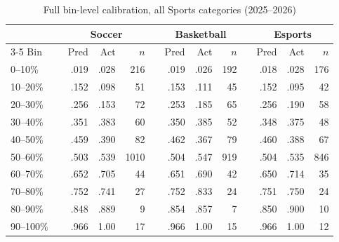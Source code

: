 \documentclass[11pt,a4paper]{article}
\begin{document}
\begin{table}[H]
\centering
\caption{Full bin-level calibration, all Sports categories (2025--2026)}
\label{tab:appendix_sports}
\scriptsize
\begin{tabular}{lcrrrcrrrcrrr}
\toprule
& & \multicolumn{3}{c}{\textbf{Soccer}} & & \multicolumn{3}{c}{\textbf{Basketball}} & & \multicolumn{3}{c}{\textbf{Esports}} \\
\cmidrule{3-5}\cmidrule{7-9}\cmidrule{11-13}
Bin & & Pred & Act & $n$ & & Pred & Act & $n$ & & Pred & Act & $n$ \\
\midrule
0--10\%  && .019 & .028 & 216 && .019 & .026 & 192 && .018 & .028 & 176 \\
10--20\% && .152 & .098 &  51 && .153 & .111 &  45 && .152 & .095 &  42 \\
20--30\% && .256 & .153 &  72 && .253 & .185 &  65 && .256 & .190 &  58 \\
30--40\% && .351 & .383 &  60 && .350 & .385 &  52 && .348 & .375 &  48 \\
40--50\% && .459 & .390 &  82 && .462 & .367 &  79 && .460 & .388 &  67 \\
50--60\% && .503 & .539 & 1010 && .504 & .547 & 919 && .504 & .535 & 846 \\
60--70\% && .652 & .705 &  44 && .651 & .690 &  42 && .650 & .714 &  35 \\
70--80\% && .752 & .741 &  27 && .752 & .833 &  24 && .751 & .750 &  24 \\
80--90\% && .848 & .889 &   9 && .854 & .857 &   7 && .850 & .900 &  10 \\
90--100\%&& .966 & 1.00 &  17 && .966 & 1.00 &  15 && .966 & 1.00 &  12 \\
\bottomrule
\end{tabular}
\end{table}
\end{document}
